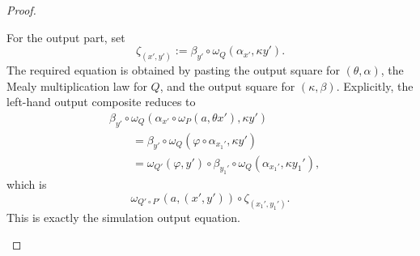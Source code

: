 \begin{proof}
\begin{enumerate}
        For the output part, set
        \[
            \zeta_{(x',y')}
            :=
            \beta_{y'}\circ\omega_Q(\alpha_{x'},\kappa y').
        \]
        The required equation is obtained by pasting the output square for \((\theta,\alpha)\), the Mealy multiplication law for \(Q\), and the output square for \((\kappa,\beta)\). Explicitly, the left-hand output composite reduces to
        \[
        \begin{aligned}
            &\beta_{y'}\circ
            \omega_Q(
                \alpha_{x'}\circ\omega_P(a,\theta x'),
                \kappa y'
            )
            \\
            &\qquad=
            \beta_{y'}\circ
            \omega_Q(
                \varphi\circ\alpha_{x_1'},
                \kappa y'
            )
            \\
            &\qquad=
            \omega_{Q'}(\varphi,y')\circ
            \beta_{y_1'}\circ
            \omega_Q(\alpha_{x_1'},\kappa y_1'),
        \end{aligned}
        \]
        which is
        \[
            \omega_{Q'\circ P'}(a,(x',y'))\circ\zeta_{(x_1',y_1')}.
        \]
        This is exactly the simulation output equation.
    \end{enumerate}
\end{proof}

